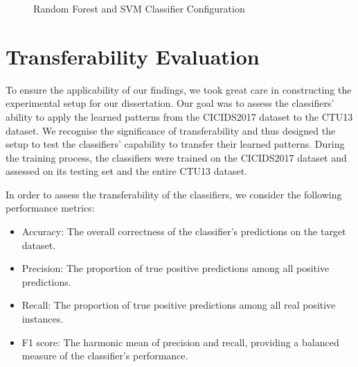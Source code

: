 \begin{figure}[H]
    \centering
    \caption{Random Forest and SVM Classifier Configuration}\label{fig:RandomForest+SVMClassifierClassifierConfig}
\end{figure}

\section{Transferability Evaluation}\label{sec:TransferabilityEvaluation}

To ensure the applicability of our findings, we took great care in constructing the experimental setup for our dissertation. Our goal was to assess the classifiers' ability to apply the learned patterns from the CICIDS2017 dataset to the CTU13 dataset. We recognise the significance of transferability and thus designed the setup to test the classifiers' capability to transfer their learned patterns. During the training process, the classifiers were trained on the CICIDS2017 dataset and assessed on its testing set and the entire CTU13 dataset.

In order to assess the transferability of the classifiers, we consider the following performance metrics:

\begin{itemize}
\item Accuracy: The overall correctness of the classifier's predictions on the target dataset.
\item Precision: The proportion of true positive predictions among all positive predictions.
\item Recall: The proportion of true positive predictions among all real positive instances.
\item F1 score: The harmonic mean of precision and recall, providing a balanced measure of the classifier's performance.
\end{itemize}

